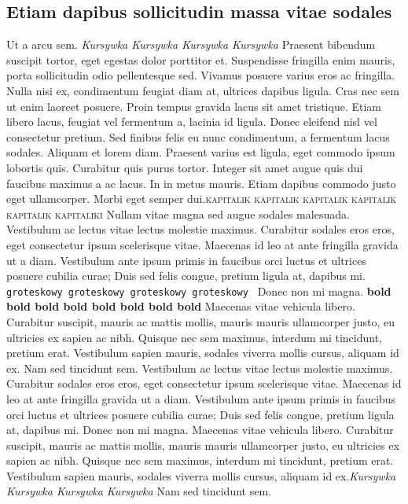 \documentclass[12pt,a4paper]{article}
\begin{document}
\subsection{Etiam dapibus sollicitudin massa vitae sodales}
Ut a arcu sem. \textit{Kursywka Kursywka Kursywka Kursywka} Praesent bibendum suscipit tortor, eget egestas dolor porttitor et. Suspendisse fringilla enim mauris, porta sollicitudin odio pellentesque sed. Vivamus posuere varius eros ac fringilla. Nulla nisi ex, condimentum feugiat diam at, ultrices dapibus ligula. Cras nec sem ut enim laoreet posuere. Proin tempus gravida lacus sit amet tristique. Etiam libero lacus, feugiat vel fermentum a, lacinia id ligula. Donec eleifend nisl vel consectetur pretium. Sed finibus felis eu nunc condimentum, a fermentum lacus sodales. Aliquam et lorem diam. Praesent varius est ligula, eget commodo ipsum lobortis quis. Curabitur quis purus tortor. Integer sit amet augue quis dui faucibus maximus a ac lacus. In in metus mauris. Etiam dapibus commodo justo eget ullamcorper. Morbi eget semper dui.\textsc{kapitalik kapitalik kapitalik kapitalik kapitalik kapitaliki}  Nullam vitae magna sed augue sodales malesuada. Vestibulum ac lectus vitae lectus molestie maximus. Curabitur sodales eros eros, eget consectetur ipsum scelerisque vitae. Maecenas id leo at ante fringilla gravida ut a diam. Vestibulum ante ipsum primis in faucibus orci luctus et ultrices posuere cubilia curae; Duis sed felis congue, pretium ligula at, dapibus mi. \texttt{groteskowy groteskowy groteskowy groteskowy } Donec non mi magna.  \textbf{bold bold bold bold bold bold bold bold} Maecenas vitae vehicula libero. Curabitur suscipit, mauris ac mattis mollis, mauris mauris ullamcorper justo, eu ultricies ex sapien ac nibh. Quisque nec sem maximus, interdum mi tincidunt, pretium erat. Vestibulum sapien mauris, sodales viverra mollis cursus, aliquam id ex. Nam sed tincidunt sem. Vestibulum ac lectus vitae lectus molestie maximus. Curabitur sodales eros eros, eget consectetur ipsum scelerisque vitae. Maecenas id leo at ante fringilla gravida ut a diam. Vestibulum ante ipsum primis in faucibus orci luctus et ultrices posuere cubilia curae; Duis sed felis congue, pretium ligula at, dapibus mi. Donec non mi magna. Maecenas vitae vehicula libero. Curabitur suscipit, mauris ac mattis mollis, mauris mauris ullamcorper justo, eu ultricies ex sapien ac nibh. Quisque nec sem maximus, interdum mi tincidunt, pretium erat. Vestibulum sapien mauris, sodales viverra mollis cursus, aliquam id ex.\textit{Kursywka Kursywka Kursywka Kursywka}  Nam sed tincidunt sem.
\end{document}
